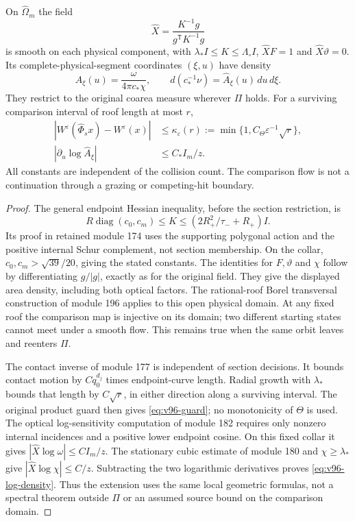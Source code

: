 \begin{lemma}
\label{lem:v96-flow}
On $\widehat\Omega_m$ the field
\[
 \widehat X=\frac{K^{-1}g}{g^{\mathsf T}K^{-1}g}
\]
is smooth on each physical component, with
$\lambda_*I\le K\le\Lambda_\circ I$, $\widehat XF=1$ and
$\widehat X\vartheta=0$. Its complete-physical-segment coordinates
$(\xi,u)$ have density
\[
 \widehat A_\xi(u)=\frac{\omega}{4\pi c_*\chi},\qquad
 d(c_*^{-1}\nu)=\widehat A_\xi(u)\,du\,d\xi.
\]
They restrict to the original coarea measure wherever $\Pi$ holds.
For a surviving comparison interval of roof length at most $r$,
\begin{align}
 |W^\varepsilon(\widehat\Phi_sx)-W^\varepsilon(x)|
 &\le\kappa_\varepsilon(r):=
       \min\{1,C_\Theta\varepsilon^{-1}\sqrt r\},
                                  \label{eq:v96-guard}\\
 |\partial_u\log\widehat A_\xi|
 &\le C_* I_m/z.                   \label{eq:v96-log-density}
\end{align}
All constants are independent of the collision count. The comparison
flow is not a continuation through a grazing or competing-hit boundary.
\end{lemma}
\begin{proof}
The general endpoint Hessian inequality, before the section restriction,
is
\[
 R\operatorname{diag}(c_0,c_m)\le K
 \le(2R_+^2/\tau_-+R_+)I.
\]
Its proof in retained module 174 uses the supporting polygonal action
and the positive internal Schur complement, not section membership.
On the collar, $c_0,c_m>\sqrt{39}/20$, giving the stated constants.
The identities for $F,\vartheta$ and $\chi$ follow by differentiating
$g/|g|$, exactly as for the original field. They give the displayed
area density, including both optical factors. The rational-roof Borel
transversal construction of module 196 applies to this open physical
domain. At any fixed roof the comparison map is injective on its
domain; two different starting states cannot meet under a smooth flow.
This remains true when the same orbit leaves and reenters $\Pi$.

The contact inverse of module 177 is independent of section decisions.
It bounds contact motion by $Cq_0^{d_j}$ times endpoint-curve length.
Radial growth with $\lambda_*$ bounds that length by $C\sqrt r$,
in either direction along a surviving interval. The original product
guard then gives \eqref{eq:v96-guard}; no monotonicity of $\Theta$ is
used. The optical log-sensitivity computation of module 182 requires
only nonzero internal incidences and a positive lower endpoint cosine.
On this fixed collar it gives $|\widehat X\log\omega|\le CI_m/z$.
The stationary cubic estimate of module 180 and $\chi\ge\lambda_*$
give $|\widehat X\log\chi|\le C/z$. Subtracting the two logarithmic
derivatives proves \eqref{eq:v96-log-density}. Thus the extension
uses the same local geometric formulas, not a spectral theorem outside
$\Pi$ or an assumed source bound on the comparison domain.
\end{proof}

